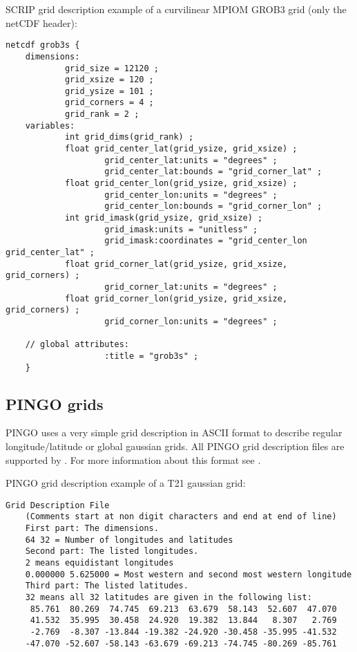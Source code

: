 SCRIP grid description example of a curvilinear MPIOM \cite{MPIOM} GROB3 grid (only the netCDF header):
\begin{lstlisting}[frame=single, backgroundcolor=\color{pyellow}, basicstyle=\footnotesize]
    netcdf grob3s {
    dimensions:
            grid_size = 12120 ;
            grid_xsize = 120 ;
            grid_ysize = 101 ;
            grid_corners = 4 ;
            grid_rank = 2 ;
    variables:
            int grid_dims(grid_rank) ;
            float grid_center_lat(grid_ysize, grid_xsize) ;
                    grid_center_lat:units = "degrees" ;
                    grid_center_lat:bounds = "grid_corner_lat" ;
            float grid_center_lon(grid_ysize, grid_xsize) ;
                    grid_center_lon:units = "degrees" ;
                    grid_center_lon:bounds = "grid_corner_lon" ;
            int grid_imask(grid_ysize, grid_xsize) ;
                    grid_imask:units = "unitless" ;
                    grid_imask:coordinates = "grid_center_lon grid_center_lat" ;
            float grid_corner_lat(grid_ysize, grid_xsize, grid_corners) ;
                    grid_corner_lat:units = "degrees" ;
            float grid_corner_lon(grid_ysize, grid_xsize, grid_corners) ;
                    grid_corner_lon:units = "degrees" ;

    // global attributes:
                    :title = "grob3s" ;
    }
\end{lstlisting}

\subsection{PINGO grids}

PINGO uses a very simple grid description in ASCII format
to describe regular longitude/latitude or global gaussian grids.
All PINGO grid description files are supported by {\CDO}. 
For more information about this format see \cite{PINGO}.

\vspace{2mm}

PINGO grid description example of a T21 gaussian grid:
\begin{lstlisting}[frame=single, backgroundcolor=\color{pyellow}, basicstyle=\footnotesize]
    Grid Description File
    (Comments start at non digit characters and end at end of line)
    First part: The dimensions.
    64 32 = Number of longitudes and latitudes
    Second part: The listed longitudes.
    2 means equidistant longitudes
    0.000000 5.625000 = Most western and second most western longitude
    Third part: The listed latitudes.
    32 means all 32 latitudes are given in the following list:
     85.761  80.269  74.745  69.213  63.679  58.143  52.607  47.070
     41.532  35.995  30.458  24.920  19.382  13.844   8.307   2.769
     -2.769  -8.307 -13.844 -19.382 -24.920 -30.458 -35.995 -41.532
    -47.070 -52.607 -58.143 -63.679 -69.213 -74.745 -80.269 -85.761
\end{lstlisting}

